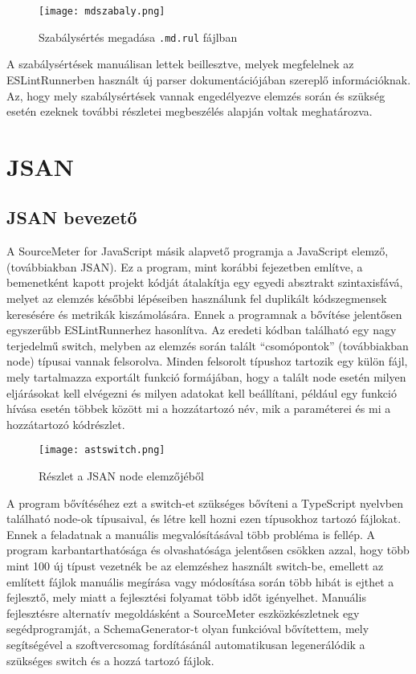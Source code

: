 \begin{figure}[!htbp]
    \caption{Szabálysértés megadása \texttt{.md.rul} fájlban}\label{fig:mdszabaly}
    \centering
    \texttt{[image: mdszabaly.png]}
\end{figure}

A szabálysértések manuálisan lettek beillesztve, melyek megfelelnek az ESLintRunnerben használt új parser dokumentációjában szereplő információknak. Az, hogy mely szabálysértések vannak engedélyezve elemzés során és szükség esetén ezeknek további részletei megbeszélés alapján voltak meghatározva.

\section{JSAN}

\subsection{JSAN bevezető}

A SourceMeter for JavaScript másik alapvető programja a JavaScript elemző, (továbbiakban JSAN). Ez a program, mint korábbi fejezetben említve, a bemenetként kapott projekt kódját átalakítja egy egyedi absztrakt szintaxisfává, melyet az elemzés későbbi lépéseiben használunk fel duplikált kódszegmensek keresésére és metrikák kiszámolására.
Ennek a programnak a bővítése jelentősen egyszerűbb ESLintRunnerhez hasonlítva. Az eredeti kódban található egy nagy terjedelmű switch, melyben az elemzés során talált ``csomópontok'' (továbbiakban node) típusai vannak felsorolva. Minden felsorolt típushoz tartozik egy külön fájl, mely tartalmazza exportált funkció formájában, hogy a talált node esetén milyen eljárásokat kell elvégezni és milyen adatokat kell beállítani, például egy funkció hívása esetén többek között mi a hozzátartozó név, mik a paraméterei és mi a hozzátartozó kódrészlet. 

\begin{figure}[!htbp]
    \caption{Részlet a JSAN node elemzőjéből}\label{fig:jsanast}
    \centering
    \texttt{[image: astswitch.png]}
\end{figure}

A program bővítéséhez ezt a switch-et szükséges bővíteni a TypeScript nyelvben található node-ok típusaival, és létre kell hozni ezen típusokhoz tartozó fájlokat.
Ennek a feladatnak a manuális megvalósításával több probléma is fellép. A program karbantarthatósága és olvashatósága jelentősen csökken azzal, hogy több mint 100 új típust vezetnék be az elemzéshez használt switch-be, emellett az említett fájlok manuális megírása vagy módosítása során több hibát is ejthet a fejlesztő, mely miatt a fejlesztési folyamat több időt igényelhet. Manuális fejlesztésre alternatív megoldásként a SourceMeter eszközkészletnek egy segédprogramját, a SchemaGenerator-t olyan funkcióval bővítettem, mely segítségével a szoftvercsomag fordításánál automatikusan legenerálódik a szükséges switch és a hozzá tartozó fájlok. 

